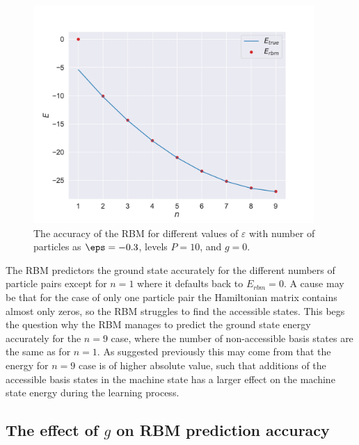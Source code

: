 \begin{figure}[H]
  \begin{center}
    \includegraphics[width=0.95\textwidth]{Figures/Plots/Pairing/val-true[particles][1-9][e=1000][n=9][eps=-0.3][g=0]}
  \end{center}
  \caption{The accuracy of the RBM for different values of $\varepsilon$ with number of particles as $\eps = -0.3$, levels $P=10$, and $g = 0$.}
\end{figure}

The RBM predictors the ground state accurately for the different numbers of particle pairs except for $n=1$ where it defaults back to $E_{rbm} = 0$. A cause may be that for the case of only one particle pair the Hamiltonian matrix contains almost only zeros, so the RBM struggles to find the accessible states. This begs the question why the RBM manages to predict the ground state energy accurately for the $n=9$ case, where the number of non-accessible basis states are the same as for $n=1$. As suggested previously this may come from that the energy for $n=9$ case is of higher absolute value, such that additions of the accessible basis states in the machine state has a larger effect on the machine state energy during the learning process.

\subsection{The effect of \texorpdfstring{$g$}{g} on RBM prediction accuracy}

